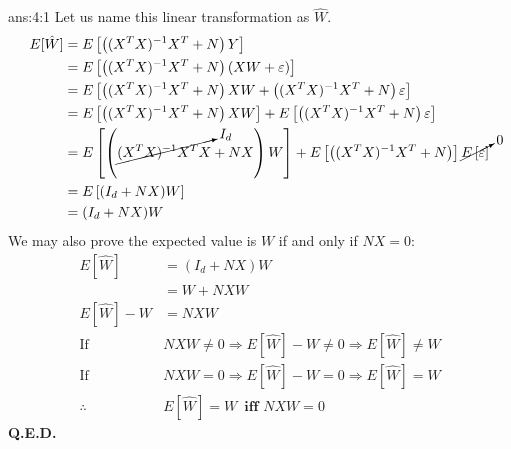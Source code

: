 \documentclass{tron}
\begin{document}
\begin{answer}[]{ans:4:1}
	Let us name this linear transformation as $\hat{W}$.
	\begin{align}
		E[\hat{W}] 
			&= E\left[ \left((X^T X)^{-1}X^T + N\right)Y \right]\\
			&= E\left[ \left((X^T X)^{-1}X^T + N\right) \left(XW + \varepsilon \right) \right]\\
			&= E\left[ \left((X^T X)^{-1}X^T + N\right)XW + \left((X^T X)^{-1}X^T + N\right)\varepsilon \right]\\
			&= E\left[ \left((X^T X)^{-1}X^T + N\right)XW \right] + E\left[ \left((X^T X)^{-1}X^T + N\right)\varepsilon \right]\\
			&= E\left[ \left(\cancelto{I_d}{(X^T X)^{-1}X^TX} + NX\right)W \right] + E\left[ \left((X^T X)^{-1}X^T + N\right)\right] \cancelto{0}{E\left[\varepsilon \right]}\\
			&= E\left[ (I_d + NX)W \right] \\
			&= (I_d + NX)W 
	\end{align}
	We may also prove the expected value is $W$ if and only if $NX = 0$:
	\begin{align}
		E[\hat{W}] 
			&= (I_d + NX)W \\
			&= W + NXW \\
		E[\hat{W}] - W &= NXW \\
		\text{If } & NXW \neq 0 \Rightarrow E[\hat{W}] - W \neq 0 \Rightarrow E[\hat{W}] \neq W \\
		\text{If } & NXW = 0 \Rightarrow E[\hat{W}] - W = 0 \Rightarrow E[\hat{W}] = W \\
		\therefore & E[\hat{W}] = W \, \textbf{ iff } NXW = 0
	\end{align}
	\textbf{Q.E.D.}
\end{answer}
\newpage
\end{document}
